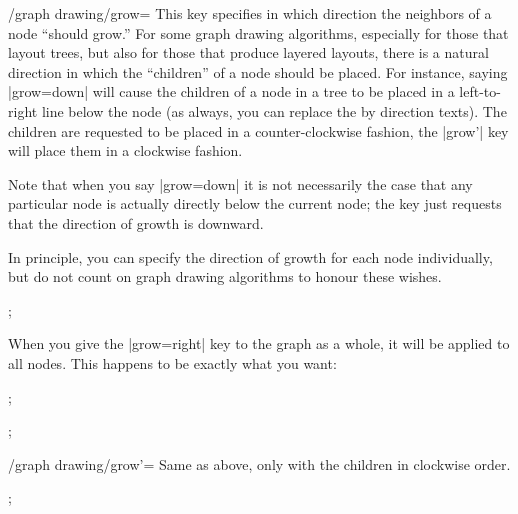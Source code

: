 {\begin{key}{/graph drawing/grow=}
  This key specifies in which direction the neighbors of a node
  ``should grow.'' For some graph drawing algorithms, especially for
  those that layout trees, but also for those that produce layered
  layouts, there is a natural direction in which the ``children'' of
  a node should be placed. For instance, saying |grow=down| will cause
  the children of a node in a tree to be placed in a left-to-right
  line below the node (as always, you can replace the 
  by direction texts). The children are requested to be placed in a
  counter-clockwise fashion, the |grow'| key will place them in a
  clockwise fashion.
  
  Note that when you say |grow=down| it is not necessarily the case
  that any particular node is actually directly below the current
  node; the key just requests that the direction of growth is
  downward.
  
  In principle, you can specify the direction of growth for each node 
  individually, but do not count on graph drawing algorithms to
  honour these wishes.
  
\begin{codeexample}[]
\tikz {};
\end{codeexample}

  When you give the |grow=right| key to the graph as a whole, it will
  be applied to all nodes. This happens to be exactly what you want:
  
\begin{codeexample}[]
\tikz {};
\end{codeexample}
  
\begin{codeexample}[]
\tikz
  ;
\end{codeexample}
\end{key}
  
\begin{key}{/graph drawing/grow'=}
  Same as above, only with the children in clockwise order.
\begin{codeexample}[]
\tikz {};
\end{codeexample}
\end{key}



}
